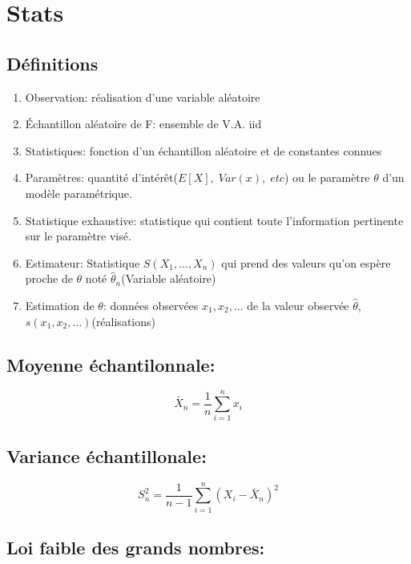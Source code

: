 \chapter{Stats}\label{stats}


\section{Définitions}\label{definitions}

\begin{enumerate}
\item Observation: réalisation d'une variable aléatoire
\item Échantillon aléatoire de F: ensemble de V.A. iid
\item Statistiques: fonction d'un échantillon aléatoire et de constantes connues
\item Paramètres: quantité d'intérêt(\(E[X],\;Var(x),\;etc\)) ou le paramètre \(\theta\) d'un modèle paramétrique.
\item Statistique exhaustive: statistique qui contient toute l'information pertinente sur le paramètre visé.
\item Estimateur: Statistique \(S(X_1,\dots,X_n)\) qui prend des valeurs qu'on espère proche de \(\theta\) noté \(\hat{\theta}_n\)(Variable aléatoire)
\item Estimation de \(\theta\): données observées \(x_1,x_2,\dots\) de la valeur observée \(\hat{\theta}\), \(s(x_1,x_2,\dots)\)(réalisations)
\end{enumerate}

\section{Moyenne échantilonnale:}\label{moyenne-echantilonnale}

\[
\bar{X}_n=\frac{1}{n}\sum_{i=1}^n x_i
\]

\section{Variance échantillonale:}\label{variance-echantillonale}

\[
S^2_n= \frac{1}{n-1}\sum^n_{i=1}\left(X_i-\bar{X}_n\right)^2
\]

\section{Loi faible des grands nombres:}\label{loi-faible-des-grands-nombres}

